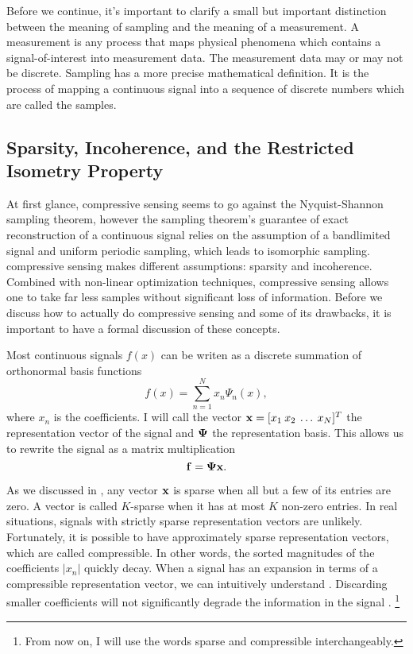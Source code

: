 Before we continue, it's important to clarify a small but important distinction between the meaning of \gls{sampling} and the meaning of a \gls{measurement}. A measurement is any process that maps physical phenomena which contains a signal-of-interest into measurement data. The measurement data may or may not be discrete. Sampling has a more precise mathematical definition. It is the process of mapping a continuous signal into a sequence of discrete numbers which are called the samples. 

\subsection{Sparsity, Incoherence, and the Restricted Isometry Property}

At first glance, \gls{compressive sensing} seems to go against the Nyquist-Shannon sampling theorem, however the sampling theorem's guarantee of exact reconstruction of a continuous signal relies on the assumption of a bandlimited signal and uniform periodic sampling, which leads to isomorphic sampling. \Gls{compressive sensing} makes different assumptions:  \gls{sparsity} and \gls{incoherence}. Combined with non-linear optimization techniques, \gls{compressive sensing} allows one to take far less samples without significant loss of information. Before we discuss how to actually do compressive sensing and some of its drawbacks, it is important to have a formal discussion of these concepts.

Most continuous signals $f(x)$ can be writen as a discrete summation of orthonormal basis functions
\begin{equation}
	f(x) = \sum_{n=1}^{N} x_n \Psi_n(x),
	\label{eq:expansionEquation1}
\end{equation}
where $x_n$ is the coefficients. I will call the vector $\mathbf{x} = [ x_{1} \: x_{2} \: \dots \: x_{N} ]^T$ the representation vector of the signal and $\mathbf{\Psi}$ the representation basis. This allows us to rewrite the signal as a matrix multiplication
\begin{equation}
	\mathbf{f} = \mathbf{\Psi}\mathbf{x}.
\end{equation}

As we discussed in , any vector $\mathbf{x}$ is \gls{sparse} when all but a few of its entries are zero. A vector is called $K$-sparse when it has at most $K$ non-zero entries. In real situations, signals with strictly sparse representation vectors are unlikely. Fortunately, it is possible to have approximately sparse representation vectors, which are called \gls{compressible}. In other words, the sorted magnitudes of the coefficients $|x_n|$ quickly decay. When a signal has an expansion in terms of a compressible representation vector, we can intuitively understand . Discarding smaller coefficients will not significantly degrade the information in the signal \cite{candes2008introduction}. \footnote{From now on, I will use the words \gls{sparse} and \gls{compressible} interchangeably.} 

